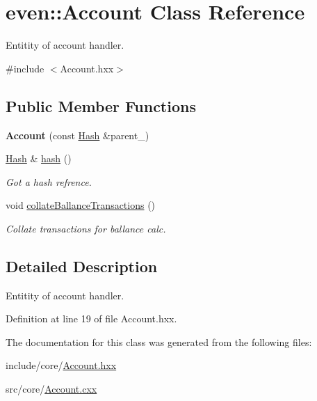 \hypertarget{classeven_1_1_account}{}\section{even\+:\+:Account Class Reference}
\label{classeven_1_1_account}


Entitity of account handler.  




{\ttfamily \#include $<$Account.\+hxx$>$}

\subsection*{Public Member Functions}
\begin{DoxyCompactItemize}
\item 
\mbox{\label{classeven_1_1_account_a14524009aeca6274c9cd5aee09b783b0}} 
{\bfseries Account} (const \mbox{\hyperlink{classeven_1_1_hash}{Hash}} \&parent\+\_\+)
\item 
\mbox{\label{classeven_1_1_account_a1d10aefb66f158efbb83b006e2cc7b43}} 
\mbox{\hyperlink{classeven_1_1_hash}{Hash}} \& \mbox{\hyperlink{classeven_1_1_account_a1d10aefb66f158efbb83b006e2cc7b43}{hash}} ()
\begin{DoxyCompactList}\small\item\em Got a hash refrence. \end{DoxyCompactList}\item 
\mbox{\label{classeven_1_1_account_ab8e969efdb9e02bf6d420fa4b43d51e2}} 
void \mbox{\hyperlink{classeven_1_1_account_ab8e969efdb9e02bf6d420fa4b43d51e2}{collate\+Ballance\+Transactions}} ()
\begin{DoxyCompactList}\small\item\em Collate transactions for ballance calc. \end{DoxyCompactList}\end{DoxyCompactItemize}


\subsection{Detailed Description}
Entitity of account handler. 

Definition at line 19 of file Account.\+hxx.



The documentation for this class was generated from the following files\+:\begin{DoxyCompactItemize}
\item 
include/core/\mbox{\hyperlink{_account_8hxx}{Account.\+hxx}}\item 
src/core/\mbox{\hyperlink{_account_8cxx}{Account.\+cxx}}\end{DoxyCompactItemize}
